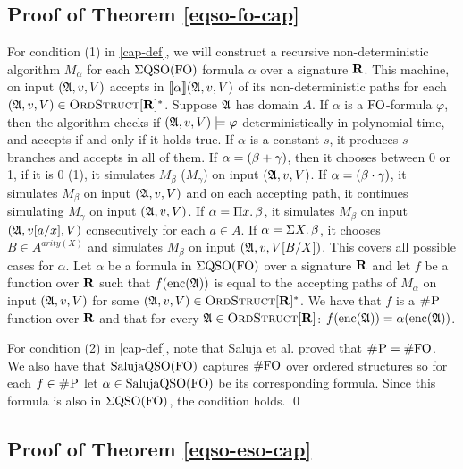 \subsection{Proof of Theorem \ref{eqso-fo-cap}}

For condition (1) in \ref{cap-def}, we will construct a recursive non-deterministic algorithm $M_{\alpha}$ for each $\Sigma{\rm QSO}({\rm FO})$ formula $\alpha$ over a signature $\mathbf{R}$. This machine, on input $(\mathfrak{A},v,V)$ accepts in ${\llbracket{}{\alpha}\rrbracket}(\mathfrak{A},v,V)$ of its non-deterministic paths for each $(\mathfrak{A},v,V) \in \text{\sc OrdStruct}[\mathbf{R}]^*$. Suppose $\mathfrak{A}$ has domain $A$. If $\alpha$ is a ${\rm FO}$-formula $\varphi$, then the algorithm checks if $(\mathfrak{A},v,V)\models\varphi$ deterministically in polynomial time, and accepts if and only if it holds true. If $\alpha$ is a constant $s$, it produces $s$ branches and accepts in all of them. If $\alpha = (\beta + \gamma)$, then it chooses between 0 or 1, if it is 0 (1), it simulates $M_{\beta}$ ($M_{\gamma}$) on input $(\mathfrak{A},v,V)$. If $\alpha = (\beta \cdot \gamma)$, it simulates $M_{\beta}$ on input $(\mathfrak{A},v,V)$ and on each accepting path, it continues simulating $M_{\gamma}$ on input $(\mathfrak{A},v,V)$.%
If $\alpha = \Pi{x}.\,\beta$, it simulates $M_{\beta}$ on input $(\mathfrak{A},v[a/x],V)$ consecutively for each $a\in A$. If $\alpha = \Sigma{X}.\,\beta$, it chooses $B\in A^{arity(X)}$ and simulates $M_{\beta}$ on input $(\mathfrak{A},v,V[B/X])$. This covers all possible cases for $\alpha$. Let $\alpha$ be a formula in $\Sigma{\rm QSO}({\rm FO})$ over a signature $\mathbf{R}$ and let $f$ be a function over $\mathbf{R}$ such that $f({\rm enc}(\mathfrak{A}))$ is equal to the accepting paths of $M_{\alpha}$ on input $(\mathfrak{A},v,V)$ for some $(\mathfrak{A},v,V) \in \text{\sc OrdStruct}[\mathbf{R}]^*$. We have that $f$ is a $\text{\sc \#P}$ function over $\mathbf{R}$ and that for every $\mathfrak{A}\in\text{\sc OrdStruct}[\mathbf{R}]$: $f({\rm enc}(\mathfrak{A})) = \alpha({\rm enc}(\mathfrak{A}))$.

For condition (2) in \ref{cap-def}, note that Saluja et al. \cite{DBLP:journals/jcss/SalujaST95} proved that $\text{\sc \#P} = \#{\rm FO}$. We also have that $\text{\rm Saluja}{\rm QSO}({\rm FO})$ captures $\#{\rm FO}$ over ordered structures so for each $f\in \text{\sc \#P}$ let $\alpha \in \text{\rm Saluja}{\rm QSO}({\rm FO})$ be its corresponding formula. Since this formula is also in $\Sigma{\rm QSO}({\rm FO})$, the condition holds. \qed

\subsection{Proof of Theorem \ref{eqso-eso-cap}}

